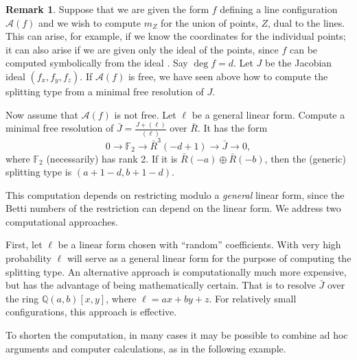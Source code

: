 \documentclass[12pt]{amsart}
\numberwithin{equation}{section}
\theoremstyle{definition}
\newtheorem{remark}[theorem]{Remark}
\begin{document}
\begin{remark}
   \label{rem:compute split type}
Suppose that we are given the form $f$ defining a line configuration $\mathcal A(f)$ and we wish to compute $m_Z$ for the union of points, $Z$,  dual to the lines. This can arise, for example, if we know the coordinates for the individual points; it can also arise if we are given only the ideal of the points, since $f$ can be computed symbolically  from the ideal \cite{MP}.
Say $\deg f = d$. Let $J$ be the Jacobian ideal $(f_x, f_y,f_z)$. 
If $\mathcal A(f)$ is free, we have seen above how to compute the splitting type from a   minimal free resolution of $J$.  

Now assume that $\mathcal A(f)$ is not free. Let $\ell$ be a general linear form. Compute a minimal free resolution of $\bar J = \frac{J+(\ell)}{(\ell)}$ over $\bar R$. It has the form 
\[
0 \rightarrow \mathbb F_2 \rightarrow \bar{R}^3 (-d+1) \rightarrow \bar J \rightarrow 0, 
\]
where $\mathbb F_2$ (necessarily) has rank 2. If it is $\bar{R}(-a) \oplus \bar{R}(-b)$,  then the (generic) splitting type is $(a+1-d,b+1-d)$.

This computation depends on restricting modulo a {\em general} linear form, since the Betti numbers of the restriction can depend on the linear form. We address two computational approaches. 

First, let $\ell$ be a linear form chosen with ``random'' coefficients. With very high probability $\ell$ will serve as a general linear form for the purpose  of computing the splitting type. 
An alternative approach is computationally much more expensive, but has the advantage of being mathematically certain. That is to resolve $\bar{J}$ over the ring $\mathbb Q(a,b)[x,y]$, where $\ell = ax + by + z$. For relatively small configurations, this approach is effective.

\end{remark}

To shorten the computation, in many cases it may be possible to combine ad hoc arguments and computer calculations, as in the following example.
\end{document}

